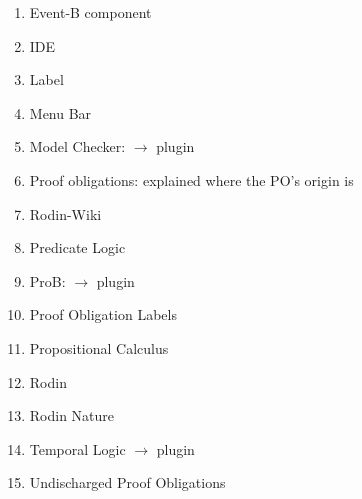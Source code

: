 \begin{enumerate}
\begin{enumerate}
  \item Event-B component
  \item IDE
  \item Label
  \item Menu Bar
  \item Model Checker: $\to$ plugin
  \item Proof obligations: explained where the PO's origin is
  \item Rodin-Wiki
  \item Predicate Logic
  \item ProB: $\to$ plugin
  \item Proof Obligation Labels
  \item Propositional Calculus
  \item Rodin 
  \item Rodin Nature
  \item Temporal Logic $\to$ plugin
  \item Undischarged Proof Obligations
  \end{enumerate}

\end{enumerate}

